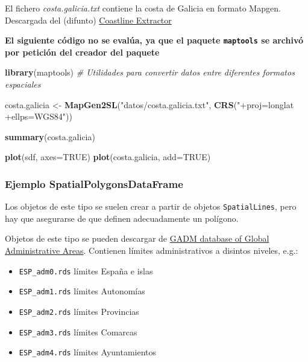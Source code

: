 \documentclass[
]{book}
\newenvironment{Shaded}{\begin{snugshade}}{\end{snugshade}}
\newcommand{\AttributeTok}[1]{\textcolor[rgb]{0.13,0.29,0.53}{#1}}
\newcommand{\CommentTok}[1]{\textcolor[rgb]{0.56,0.35,0.01}{\textit{#1}}}
\newcommand{\ConstantTok}[1]{\textcolor[rgb]{0.56,0.35,0.01}{#1}}
\newcommand{\FunctionTok}[1]{\textcolor[rgb]{0.13,0.29,0.53}{\textbf{#1}}}
\newcommand{\NormalTok}[1]{#1}
\newcommand{\OtherTok}[1]{\textcolor[rgb]{0.56,0.35,0.01}{#1}}
\newcommand{\StringTok}[1]{\textcolor[rgb]{0.31,0.60,0.02}{#1}}
\theoremstyle{break}
\theoremstyle{definition}
\theoremstyle{definition}
\theoremstyle{definition}
\theoremstyle{definition}
\theoremstyle{remark}
\begin{document}
El fichero \emph{costa.galicia.txt} contiene la costa de Galicia en formato Mapgen.
Descargada del (difunto) \href{http://www.ngdc.noaa.gov/mgg/shorelines/shorelines.html}{Coastline Extractor}

\textbf{El siguiente código no se evalúa, ya que el paquete \texttt{maptools} se archivó por petición del creador del paquete}

\begin{Shaded}
\begin{Highlighting}[]
\FunctionTok{library}\NormalTok{(maptools) }\CommentTok{\# Utilidades para convertir datos entre diferentes formatos espaciales}

\NormalTok{costa.galicia }\OtherTok{\textless{}{-}} \FunctionTok{MapGen2SL}\NormalTok{(}\StringTok{"datos/costa.galicia.txt"}\NormalTok{, }\FunctionTok{CRS}\NormalTok{(}\StringTok{"+proj=longlat +ellps=WGS84"}\NormalTok{))}

\FunctionTok{summary}\NormalTok{(costa.galicia)}

\FunctionTok{plot}\NormalTok{(sdf, }\AttributeTok{axes=}\ConstantTok{TRUE}\NormalTok{)}
\FunctionTok{plot}\NormalTok{(costa.galicia, }\AttributeTok{add=}\ConstantTok{TRUE}\NormalTok{)}
\end{Highlighting}
\end{Shaded}

\subsubsection{Ejemplo SpatialPolygonsDataFrame}\label{ejemplo-spatialpolygonsdataframe}

Los objetos de este tipo se suelen crear a partir de objetos \texttt{SpatialLines},
pero hay que asegurarse de que definen adecuadamente un polígono.

Objetos de este tipo se pueden descargar de
\href{http://www.gadm.org}{GADM database of Global Administrative Areas}.
Contienen límites administrativos a disintos niveles, e.g.:

\begin{itemize}
\item
  \texttt{ESP\_adm0.rds} límites España e islas
\item
  \texttt{ESP\_adm1.rds} límites Autonomías
\item
  \texttt{ESP\_adm2.rds} límites Provincias
\item
  \texttt{ESP\_adm3.rds} límites Comarcas
\item
  \texttt{ESP\_adm4.rds} límites Ayuntamientos
\end{itemize}
\end{document}
